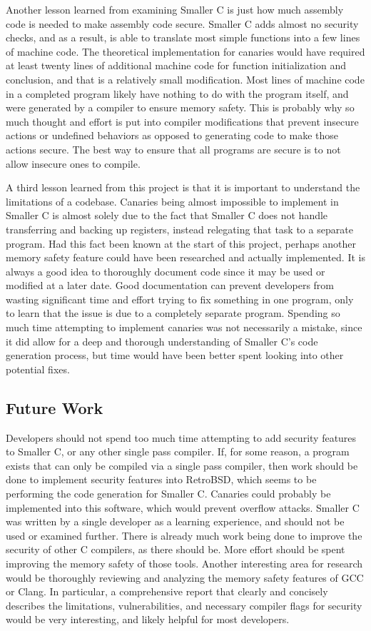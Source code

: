 \documentclass[sigconf, anonymous]{acmart}
\begin{document}
Another lesson learned from examining Smaller C is just how much assembly code is needed to make assembly code secure. Smaller C adds almost no security checks, and as a result, is able to translate most simple functions into a few lines of machine code. The theoretical implementation for canaries would have required at least twenty lines of additional machine code for function initialization and conclusion, and that is a relatively small modification. Most lines of machine code in a completed program likely have nothing to do with the program itself, and were generated by a compiler to ensure memory safety. This is probably why so much thought and effort is put into compiler modifications that prevent insecure actions or undefined behaviors as opposed to generating code to make those actions secure. The best way to ensure that all programs are secure is to not allow insecure ones to compile.

A third lesson learned from this project is that it is important to understand the limitations of a codebase. Canaries being almost impossible to implement in Smaller C is almost solely due to the fact that Smaller C does not handle transferring and backing up registers, instead relegating that task to a separate program. Had this fact been known at the start of this project, perhaps another memory safety feature could have been researched and actually implemented. It is always a good idea to thoroughly document code since it may be used or modified at a later date. Good documentation can prevent developers from wasting significant time and effort trying to fix something in one program, only to learn that the issue is due to a completely separate program. Spending so much time attempting to implement canaries was not necessarily a mistake, since it did allow for a deep and thorough understanding of Smaller C’s code generation process, but time would have been better spent looking into other potential fixes. 

\subsection{Future Work}

Developers should not spend too much time attempting to add security features to Smaller C, or any other single pass compiler. If, for some reason, a program exists that can only be compiled via a single pass compiler, then work should be done to implement security features into RetroBSD, which seems to be performing the code generation for Smaller C. Canaries could probably be implemented into this software, which would prevent overflow attacks. Smaller C was written by a single developer as a learning experience, and should not be used or examined further. There is already much work being done to improve the security of other C compilers, as there should be. More effort should be spent improving the memory safety of those tools. Another interesting area for research would be thoroughly reviewing and analyzing the memory safety features of GCC or Clang. In particular, a comprehensive report that clearly and concisely describes the limitations, vulnerabilities, and necessary compiler flags for security would be very interesting, and likely helpful for most developers. 
\end{document}
